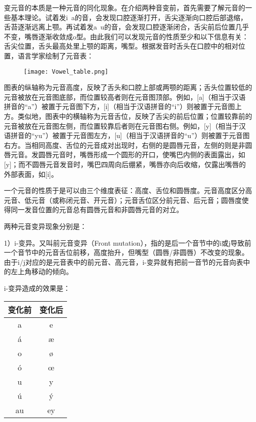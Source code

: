 变元音的本质是一种元音的同化现象。在介绍两种音变前，首先需要了解元音的一些基本理论。试着发i~a的音，会发现口腔逐渐打开，舌尖逐渐向口腔后部退缩，舌苔逐渐远离上颚。再试着发a~u的音，会发现口腔逐渐闭合，舌尖前后位置几乎不变，嘴唇逐渐收敛成o型。由此我们可以发现元音的性质至少和以下信息有关：舌尖位置，舌头最高处里上颚的距离，嘴型。根据发音时舌头在口腔中的相对位置，语言学家绘制了元音表：

\begin{figure}[H]
  \centering
  \texttt{[image: Vowel\_table.png]}
\end{figure}

图表的纵轴称为元音高度，反映了舌头和口腔上部或两颚的距离；舌头位置较低的元音被放在元音图底部，而位置较高者则在元音图顶部。例如，{[}a{]}（相当于汉语拼音的``a''）被置于元音图下方，{[}i{]}（相当于汉语拼音的``i''）则被置于元音图上方。类似地，图表中的横轴称为元音舌位，反映了舌尖的前后位置；位置较靠前的元音被放在元音图左侧，而位置较靠后者则在元音图右侧。例如，{[}y{]}（相当于汉语拼音的``yu''）被置于元音图左方，{[}u{]}（相当于汉语拼音的``u''）则被置于元音图右方。当相同高度、舌位的元音成对出现时，右侧的是圆唇元音，左侧的则是非圆唇元音。发圆唇元音时，嘴唇形成一个圆形的开口，使嘴巴内侧的表面露出，如{[}y{]}；而不圆唇元音发音时，嘴巴四周向后绷紧，嘴唇亦向后收缩，仅露出嘴唇的外部表面，如{[}i{]}。

一个元音的性质于是可以由三个维度表征：高度、舌位和圆唇度。元音高度区分高元音、低元音（或称闭元音、开元音）；元音舌位区分前元音、后元音；圆唇度使得同一发音位置的元音总有圆唇元音和非圆唇元音的对立。

两种元音变异现象分别是：

1）i-变异。又叫前元音变异（Front mutation），指的是后一个音节中的i或j导致前一个音节中的元音舌位前移，高度抬升，但嘴型（圆唇/非圆唇）不改变的现象。由于i/j对应的是元音表中的前元音、高元音，i-变异就有把前一音节的元音向表中的左上角移动的倾向。

i-变异造成的效果是：
\begin{table}[H]
  \centering
  \begin{tabular}{cc}
    \hline
    \textbf{变化前} & \textbf{变化后} \\ \hline
    a            & e            \\
    á            & æ            \\
    o            & ø            \\
    ó            & œ            \\
    u            & y            \\
    ú            & ý            \\
    au           & ey           \\ \hline
  \end{tabular}
\end{table}

